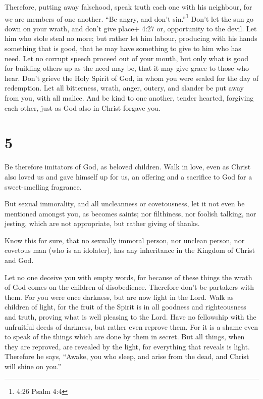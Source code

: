  Therefore, putting away falsehood, speak truth each one
with his neighbour, for we are members of one another. 
``Be angry, and don't sin.''\footnote{4:26 Psalm 4:4} Don't let the sun
go down on your wrath,  and don't give place+ 4:27 or,
opportunity to the devil.  Let him who stole steal no more;
but rather let him labour, producing with his hands something that is
good, that he may have something to give to him who has need.
 Let no corrupt speech proceed out of your mouth, but only
what is good for building others up as the need may be, that it may give
grace to those who hear.  Don't grieve the Holy Spirit of
God, in whom you were sealed for the day of redemption. 
Let all bitterness, wrath, anger, outcry, and slander be put away from
you, with all malice.  And be kind to one another, tender
hearted, forgiving each other, just as God also in Christ forgave you.

\hypertarget{section-4}{%
\section{5}\label{section-4}}

 Be therefore imitators of God, as beloved children.
 Walk in love, even as Christ also loved us and gave himself
up for us, an offering and a sacrifice to God for a sweet-smelling
fragrance.

 But sexual immorality, and all uncleanness or covetousness,
let it not even be mentioned amongst you, as becomes saints;
 nor filthiness, nor foolish talking, nor jesting, which are
not appropriate, but rather giving of thanks.

 Know this for sure, that no sexually immoral person, nor
unclean person, nor covetous man (who is an idolater), has any
inheritance in the Kingdom of Christ and God.

 Let no one deceive you with empty words, for because of
these things the wrath of God comes on the children of disobedience.
 Therefore don't be partakers with them.  For
you were once darkness, but are now light in the Lord. Walk as children
of light,  for the fruit of the Spirit is in all goodness
and righteousness and truth,  proving what is well pleasing
to the Lord.  Have no fellowship with the unfruitful deeds
of darkness, but rather even reprove them.  For it is a
shame even to speak of the things which are done by them in secret.
 But all things, when they are reproved, are revealed by
the light, for everything that reveals is light.  Therefore
he says, ``Awake, you who sleep, and arise from the dead, and Christ
will shine on you.''


